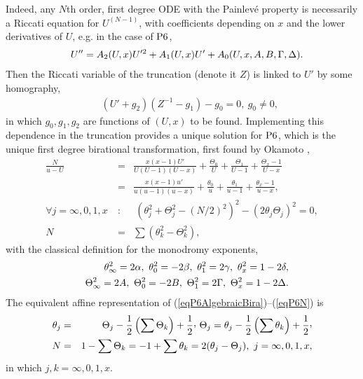 \documentclass[10pt]{article}
\begin{document}
Indeed,
any $N$th order, first degree ODE with the Painlev\'e property
is necessarily \cite[pp.~396--409]{PaiLecons} a
Riccati equation for $U^{(N-1)}$, with coefficients depending on
$x$ and the lower derivatives of $U$, e.g. in the case of ${\rm P6}$,
\begin{eqnarray}
& & U''=A_2(U,x) U'^2 + A_1(U,x) U' + A_0(U,x,A,B,\Gamma,\Delta).
\label{eqRiccatiUprime}
\end{eqnarray}
Then the Riccati variable of the truncation (denote it $Z$)
is linked to $U'$ by some homography,
\begin{eqnarray}
& &
 (U' + g_2) (Z^{-1} - g_1) - g_0=0,\ g_0 \not=0,
\label{eqHomographyRUprime}
\end{eqnarray}
in which $g_0,g_1,g_2$ are functions of $(U,x)$ to be found.
Implementing this dependence in the truncation \cite{CM2001b}
provides a unique solution for ${\rm P6}$,
which is 
the unique first degree birational transformation, 
first found by Okamoto \cite{Okamoto1986Pn},
\begin{eqnarray}
\frac{N}{u-U}
& = &
  \frac{x (x-1) U'}{U (U-1)(U-x)}
 +\frac{\Theta_0}{U}+\frac{\Theta_1}{U-1}+\frac{\Theta_x-1}{U-x}
\label{eqTP6uvecTUnsigned}
\\
& = &
  \frac{x(x-1)u'}{u(u-1)(u-x)}
 +\frac{\theta_0}{u}+\frac{\theta_1}{u-1}+\frac{\theta_x-1}{u-x},
\label{eqTP6uvectUnsigned}
\\
\forall j=\infty,0,1,x\ & : & \
(\theta_j^2+ \Theta_j^2 - (N/2)^2)^2 - (2 \theta_j \Theta_j)^2=0,
\label{eqP6AlgebraicBira}
\\
N
& = &
\sum (\theta_k^2 - \Theta_k^2),
\label{eqP6N}
\end{eqnarray}
with the classical definition for the monodromy exponents,
\begin{eqnarray}
& &
\theta_\infty^2= 2 \alpha,\
\theta_0^2     =-2 \beta,\
\theta_1^2     = 2 \gamma,\
\theta_x^2     =1 - 2 \delta,
\\
& &
\Theta_\infty^2= 2 A,\
\Theta_0^2     =-2 B,\
\Theta_1^2     = 2 \Gamma,\
\Theta_x^2     =1 - 2 \Delta.
\end{eqnarray}
The equivalent affine representation of
(\ref{eqP6AlgebraicBira})--(\ref{eqP6N}) is
\begin{eqnarray}
\theta_j &=& \Theta_j - \frac{1}{2} \left(\sum \Theta_k\right) + \frac{1}{2}
\ccomma\
\Theta_j = \theta_j - \frac{1}{2} \left(\sum \theta_k\right) + \frac{1}{2}
\ccomma
\label{eqT9}
\\
N
& = &
  1 - \sum \Theta_k
=
 -1 + \sum \theta_k
=
  2 (\theta_j - \Theta_j),\ j=\infty,0,1,x,
\label{eqNvecT}
\end{eqnarray}
in which $j,k=\infty,0,1,x$.
\end{document}
